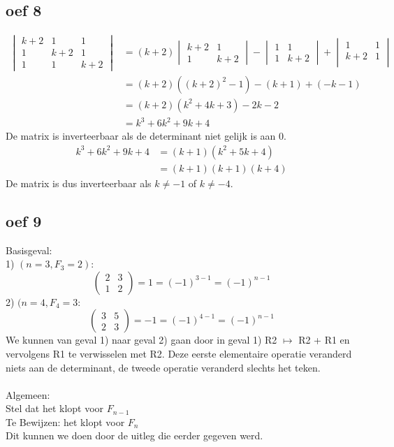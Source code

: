 \documentclass[lineaire_algebra_oplossingen.tex]{subfiles}
\begin{document}
\subsection{oef 8}
\begin{align*}
    \begin{vmatrix}
        k+2 & 1 & 1\\
        1 & k+2 & 1\\
        1 & 1 & k+2
    \end{vmatrix}
    &= (k+2) 
    \begin{vmatrix}
        k+2 & 1\\
        1 & k+2    
    \end{vmatrix} - 
    \begin{vmatrix}
        1 & 1\\
        1 & k+2
    \end{vmatrix} + 
    \begin{vmatrix}
        1 & 1\\
        k+2 & 1\\
    \end{vmatrix}\\
    &= (k+2)((k+2)^2 - 1) - (k+1) + (-k-1)\\
    &= (k+2)(k^2 + 4k + 3) -2k - 2\\
    &= k^3 + 6k^2 + 9k + 4
\end{align*}
De matrix is inverteerbaar als de determinant niet gelijk is aan 0.
\begin{align*}
    k^3 + 6k^2 + 9k + 4 &= (k+1)(k^2 + 5k + 4)\\
    &= (k+1)(k+1)(k+4)
\end{align*}
De matrix is dus inverteerbaar als $k \neq -1$ of $k \neq -4$.

\subsection{oef 9}
Basisgeval: \\
1) $(n=3, F_{3}=2):$
\[ 
\begin{pmatrix}
2 & 3\\ 
1 & 2
\end{pmatrix}
= 1 = (-1)^{3-1} = (-1)^{n-1}
\]
2) $(n=4, F_{4}=3:$
\[
\begin{pmatrix}
3 & 5\\ 
2 & 3
\end{pmatrix}
= -1 = (-1)^{4-1} = (-1)^{n-1}
\]
We kunnen van geval 1) naar geval 2) gaan door in geval 1) R2 $\longmapsto $ R2 + R1 en vervolgens R1 te verwisselen met R2. Deze eerste elementaire operatie veranderd niets aan de determinant, de tweede operatie veranderd slechts het teken. \\
\\
Algemeen:\\
Stel dat het klopt voor $F_{n-1}$\\
Te Bewijzen: het klopt voor $F_{n}$\\
Dit kunnen we doen door de uitleg die eerder gegeven werd.
\end{document}
